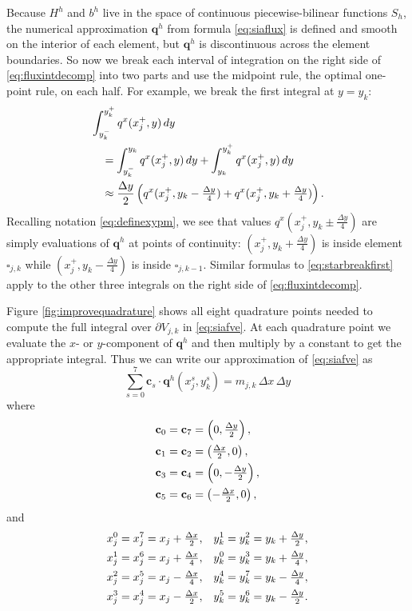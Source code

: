 \documentclass[twocolumn,letterpaper]{igs}
\newcommand\bc{\mathbf{c}}
\newcommand\bq{\mathbf{q}}
\begin{document}
Because $H^h$ and $b^h$ live in the space of continuous piecewise-bilinear functions $S_h$, the numerical approximation $\bq^h$ from formula \eqref{eq:siaflux} is defined and smooth on the interior of each element, but $\bq^h$ is discontinuous across the element boundaries.  So now we break each interval of integration on the right side of \eqref{eq:fluxintdecomp} into two parts and use the midpoint rule, the optimal one-point rule, on each half.  For example, we break the first integral at $y=y_k$:
\begin{align}
&\int_{y_k^-}^{y_k^+} q^x(x_j^+,y)\,dy  \label{eq:starbreakfirst} \\
  &\quad= \int_{y_k^-}^{y_k} q^x(x_j^+,y)\,dy + \int_{y_k}^{y_k^+} q^x(x_j^+,y)\,dy \notag \\
  &\quad\approx \frac{\Delta y}{2} \left(q^x(x_j^+,y_k-\tfrac{\Delta y}{4}) + q^x(x_j^+,y_k+\tfrac{\Delta y}{4})\right). \notag
\end{align}
Recalling notation \eqref{eq:definexypm}, we see that values $q^x(x_j^+,y_k\pm\tfrac{\Delta y}{4})$ are simply evaluations of $\bq^h$ at points of continuity: $(x_j^+,y_k+\tfrac{\Delta y}{4})$ is inside element $\square_{j,k}$ while $(x_j^+,y_k-\tfrac{\Delta y}{4})$ is inside $\square_{j,k-1}$.  Similar formulas to \eqref{eq:starbreakfirst} apply to the other three integrals on the right side of \eqref{eq:fluxintdecomp}.

Figure \ref{fig:improvequadrature} shows all eight quadrature points needed to compute the full integral over $\partial V_{j,k}$ in \eqref{eq:siafve}.  At each quadrature point we evaluate the $x$- or $y$-component of $\bq^h$ and then multiply by a constant to get the appropriate integral.  Thus we can write our approximation of \eqref{eq:siafve} as
\begin{equation}
\sum_{s=0}^7 \bc_s \cdot \bq^h(x_j^s,y_k^s) = m_{j,k}\,\Delta x\,\Delta y  \label{eq:siamstar}
\end{equation}
where
\begin{align}
\bc_0 &= \bc_7 = \left(0, \tfrac{\Delta y}{2}\right),  \label{eq:cs} \\
\bc_1 &= \bc_2 = \left(\tfrac{\Delta x}{2},0\right),  \notag \\
\bc_3 &= \bc_4 = \left(0, -\tfrac{\Delta y}{2}\right),  \notag \\
\bc_5 &= \bc_6 = \left(-\tfrac{\Delta x}{2},0\right),  \notag
\end{align}
and
\begin{align}
x_j^0 &= x_j^7 = x_j + \tfrac{\Delta x}{2}, & y_k^1 &= y_k^2 = y_k + \tfrac{\Delta y}{2}, \label{eq:xjsyks} \\
x_j^1 &= x_j^6 = x_j + \tfrac{\Delta x}{4}, & y_k^0 &= y_k^3 = y_k + \tfrac{\Delta y}{4}, \notag \\
x_j^2 &= x_j^5 = x_j - \tfrac{\Delta x}{4}, & y_k^4 &= y_k^7 = y_k - \tfrac{\Delta y}{4}, \notag \\
x_j^3 &= x_j^4 = x_j - \tfrac{\Delta x}{2}, & y_k^5 &= y_k^6 = y_k - \tfrac{\Delta y}{2}. \notag
\end{align}
\end{document}
